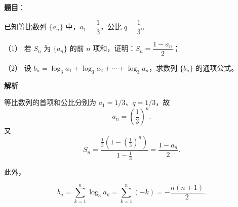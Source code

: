 \begin{answer}

\textbf{题目}：

已知等比数列 $\{a_n\}$ 中，$a_1=\dfrac13$，公比 $q=\dfrac13$。

（1） 若 $S_n$ 为 $\{a_n\}$ 的前 $n$ 项和，证明：$S_n=\dfrac{1-a_n}{2}$；

（2） 设 $b_n=\log_3a_1+\log_3a_2+\cdots+\log_3a_n$，求数列 $\{b_n\}$ 的通项公式。

\textbf{解析}


等比数列的首项和公比分别为 $a_1=1/3$、$q=1/3$，故
\nopagebreak[4]
\[
a_n=\left(\frac13\right)^n.
\]
又
\nopagebreak[4]
\[
S_n=\frac{\frac13(1-(\frac13)^n)}{1-\frac13}
=\frac{1-a_n}{2}.
\]


此外，

\nopagebreak[4]
\[
b_n=\sum_{k=1}^n\log_3a_k
=\sum_{k=1}^n(-k)
=-\frac{n(n+1)}2.
\]



\end{answer}
